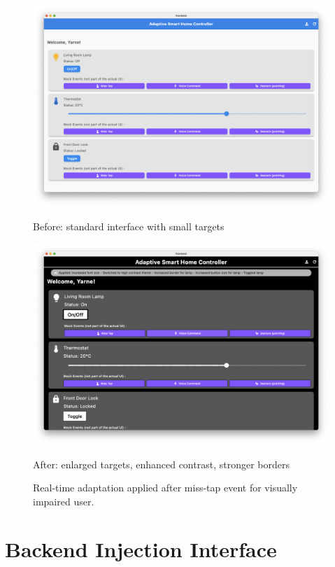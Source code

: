 \begin{figure}[H]
\centering
\begin{minipage}{.5\linewidth}
    \includegraphics[width=\linewidth]{images/fig_ui_overview.png}
    \caption*{Before: standard interface with small targets}
\end{minipage}\hfill
\begin{minipage}{.5\linewidth}
    \includegraphics[width=\linewidth]{images/fig_adapt_after.png}
    \caption*{After: enlarged targets, enhanced contrast, stronger borders}
\end{minipage}
\caption{Real-time adaptation applied after miss-tap event for visually impaired user.}
\label{fig:before-after-adaptation}
\end{figure}

\section{Backend Injection Interface}

